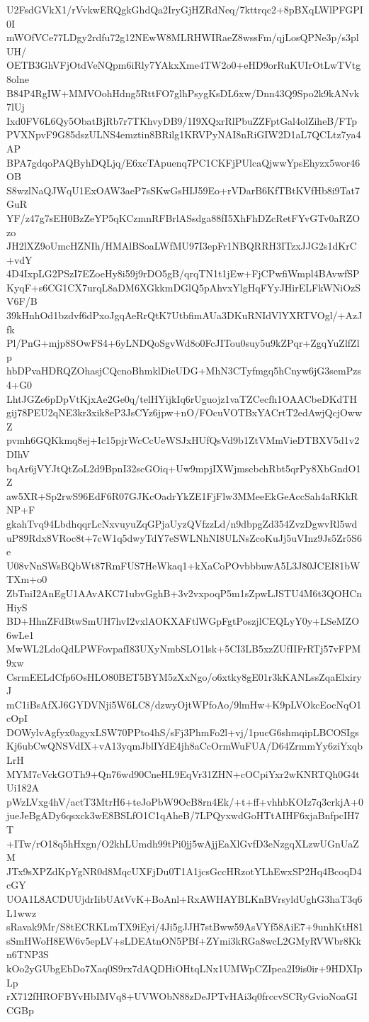 U2FsdGVkX1/rVvkwERQgkGhdQa2IryGjHZRdNeq/7kttrqc2+8pBXqLWlPFGPI0I
mWOfVCe77LDgy2rdfu72g12NEwW8MLRHWIRaeZ8wssFm/qjLosQPNe3p/s3plUH/
OETB3GhVFjOtdVeNQpm6iRly7YAkxXme4TW2o0+eHD9orRuKUIrOtLwTVtg8olne
B84P4RgIW+MMVOohHdng5RttFO7glhPsygKsDL6xw/Dnn43Q9Spo2k9kANvk7lUj
Ixd0FV6L6Qy5ObatBjRb7r7TKhvyDB9/1I9XQxrRlPbuZZFptGal4olZiheB/FTp
PVXNpvF9G85dszULNS4emztin8BRilg1KRVPyNAI8nRiGIW2D1aL7QCLtz7ya4AP
BPA7gdqoPAQByhDQLjq/E6xcTApuenq7PC1CKFjPUlcaQjwwYpsEhyzx5wor46OB
S8wzlNaQJWqU1ExOAW3aeP7sSKwGsHIJ59Eo+rVDarB6KfTBtKVfHb8i9Tat7GuR
YF/z47g7sEH0BzZeYP5qKCzmnRFBrlASsdga88fI5XhFhDZcRetFYvGTv0aRZOzo
JH2lXZ9oUmcHZNIh/HMAlBSoaLWfMU97I3epFr1NBQRRH3ITzxJJG2s1dKrC+vdY
4D4IxpLG2PSzI7EZoeHy8i59j9rDO5gB/qrqTN1t1jEw+FjCPwfiWmpl4BAvwfSP
KyqF+s6CG1CX7urqL8aDM6XGkkmDGlQ5pAhvxYlgHqFYyJHirELFkWNiOzSV6F/B
39kHnhOd1bzdvf6dPxoJgqAeRrQtK7UtbfimAUa3DKuRNIdVlYXRTVOgl/+AzJfk
Pl/PnG+mjp8SOwFS4+6yLNDQoSgvWd8o0FcJITou0suy5u9kZPqr+ZgqYuZlfZlp
hbDPvaHDRQZOhasjCQcnoBhmklDieUDG+MhN3CTyfmgq5hCnyw6jG3semPzs4+G0
LhtJGZe6pDpVtKjxAe2Ge0q/telHYijkIq6rUguojz1vaTZCecfh1OAACbeDKdTH
gij78PEU2qNE3kr3xik8eP3JsCYz6jpw+nO/FOcuVOTBxYACrtT2edAwjQcjOwwZ
pvmh6GQKkmq8ej+Ic15pjrWcCcUeWSJxHUfQsVd9b1ZtVMmVieDTBXV5d1v2DIhV
bqAr6jVYJtQtZoL2d9BpnI32scGOiq+Uw9mpjIXWjmscbchRbt5qrPy8XbGndO1Z
aw5XR+Sp2rwS96EdF6R07GJKcOadrYkZE1FjFlw3MMeeEkGeAccSah4aRKkRNP+F
gkahTvq94LbdhqqrLcNxvuyuZqGPjaUyzQVfzzLd/n9dbpgZd354ZvzDgwvRl5wd
uP89Rdx8VRoc8t+7cW1q5dwyTdY7eSWLNhNI8ULNsZcoKuJj5uVInz9Js5Zr5S6e
U08vNnSWsBQbWt87RmFUS7HeWkaq1+kXaCoPOvbbbuwA5L3J80JCEI81bWTXm+o0
ZbTniI2AnEgU1AAvAKC71ubvGghB+3v2vxpoqP5m1sZpwLJSTU4M6t3QOHCnHiyS
BD+HhnZFdBtwSmUH7hvI2vxlAOKXAFtlWGpFgtPoszjlCEQLyY0y+LSeMZO6wLe1
MwWL2LdoQdLPWFovpafI83UXyNmbSLO1lsk+5CI3LB5xzZUfIIFrRTj57vFPM9xw
CsrmEELdCfp6OsHLO80BET5BYM5zXxNgo/o6xtky8gE01r3kKANLssZqaElxiryJ
mC1iBsAfXJ6GYDVNji5W6LC8/dzwyOjtWPfoAo/9lmHw+K9pLVOkcEocNqO1cOpI
DOWylvAgfyx0agyxLSW70PPto4hS/sFj3PhmFo2l+vj/1pucG6shmqipLBCOSIgs
Kj6ubCwQNSVdIX+vA13yqmJblIYdE4jh8aCcOrmWuFUA/D64ZrmmYy6ziYxqbLrH
MYM7cVckGOTh9+Qn76wd90CneHL9EqVr31ZHN+cOCpiYxr2wKNRTQh0G4tUi182A
pWzLVxg4hV/actT3MtrH6+teJoPbW9OcB8rn4Ek/+t+ff+vhhbKOIz7q3crkjA+0
jueJeBgADy6qsxck3wE8BSLfO1C1qAheB/7LPQyxwdGoHTtAIHF6xjaBnfpcIH7T
+ITw/rO18q5hHxgn/O2khLUmdh99tPi0jj5wAjjEaXlGvfD3eNzgqXLzwUGnUaZM
JTx9sXPZdKpYgNR0d8MqcUXFjDu0T1A1jcsGccHRzotYLhEwxSP2Hq4BcoqD4cGY
UOA1L8ACDUUjdrIibUAtVvK+BoAnl+RxAWHAYBLKnBVrsyldUghG3haT3q6L1wwz
sRavak9Mr/S8tECRKLmTX9iEyi/4Ji5gJJH7stBww59AsVYf58AiE7+9unhKtH81
sSmHWoH8EW6v5epLV+sLDEAtnON5PBf+ZYmi3kRGa8wcL2GMyRVWbr8Kkn6TNP3S
kOo2yGUbgEbDo7Xaq0S9rx7dAQDHiOHtqLNx1UMWpCZIpea2I9is0ir+9HDXIpLp
rX712fHROFBYvHbIMVq8+UVWObN88zDeJPTvHAi3q0frccvSCRyGvioNoaGICGBp
